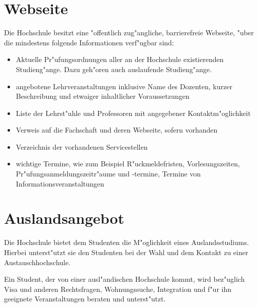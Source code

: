 \section{Webseite}

Die Hochschule besitzt eine "offentlich zug"angliche, barrierefreie Webseite, "uber die mindestens folgende Informationen verf"ugbar sind:
\begin{itemize}
\item Aktuelle Pr"ufungsordnungen aller an der Hochschule existierenden Studieng"ange. Dazu geh"oren auch auslaufende Studieng"ange.

\item angebotene Lehrveranstaltungen inklusive Name des Dozenten, kurzer Beschreibung und etwaiger inhaltlicher Voraussetzungen

\item Liste der Lehrst"uhle und Professoren mit angegebener Kontaktm"oglichkeit

\item Verweis auf die Fachschaft und deren Webseite, sofern vorhanden

\item Verzeichnis der vorhandenen Servicestellen

\item wichtige Termine, wie zum Beispiel R"uckmeldefristen, Vorlesungszeiten, Pr"ufungsanmeldungszeitr"aume und -termine, Termine von Informationsveranstaltungen
\end{itemize}


\section{Auslandsangebot}

Die Hochschule bietet dem Studenten die M"oglichkeit eines Auslandsstudiums. Hierbei
unterst"utzt sie den Studenten bei der Wahl und dem Kontakt zu einer Austauschhochschule.

Ein Student, der von einer ausl"andischen Hochschule kommt, wird bez"uglich
Visa und anderen Rechtsfragen, Wohnungssuche, Integration und f"ur ihn geeignete Veranstaltungen
beraten und unterst"utzt.
